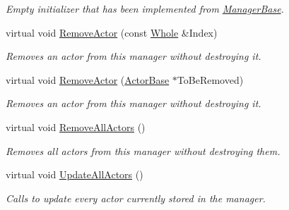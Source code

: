 \begin{DoxyCompactItemize}
\begin{DoxyCompactList}\small\item\em Empty initializer that has been implemented from \hyperlink{classMezzanine_1_1ManagerBase}{ManagerBase}. \item\end{DoxyCompactList}\item 
virtual void \hyperlink{classMezzanine_1_1ActorManager_ac74758ad6d5c03b20105d641f0e37de3}{RemoveActor} (const \hyperlink{namespaceMezzanine_adcbb6ce6d1eb4379d109e51171e2e493}{Whole} \&Index)
\begin{DoxyCompactList}\small\item\em Removes an actor from this manager without destroying it. \item\end{DoxyCompactList}\item 
virtual void \hyperlink{classMezzanine_1_1ActorManager_a5c28bea0eb64822ce94ce38762aedc1e}{RemoveActor} (\hyperlink{classMezzanine_1_1ActorBase}{ActorBase} $\ast$ToBeRemoved)
\begin{DoxyCompactList}\small\item\em Removes an actor from this manager without destroying it. \item\end{DoxyCompactList}\item 
\hypertarget{classMezzanine_1_1ActorManager_a6ca8342617fa221b0548ff9bc6bf4477}{
virtual void \hyperlink{classMezzanine_1_1ActorManager_a6ca8342617fa221b0548ff9bc6bf4477}{RemoveAllActors} ()}
\label{classMezzanine_1_1ActorManager_a6ca8342617fa221b0548ff9bc6bf4477}

\begin{DoxyCompactList}\small\item\em Removes all actors from this manager without destroying them. \item\end{DoxyCompactList}\item 
\hypertarget{classMezzanine_1_1ActorManager_a09ae1e126a501cd932dbbc9290120b7d}{
virtual void \hyperlink{classMezzanine_1_1ActorManager_a09ae1e126a501cd932dbbc9290120b7d}{UpdateAllActors} ()}
\label{classMezzanine_1_1ActorManager_a09ae1e126a501cd932dbbc9290120b7d}

\begin{DoxyCompactList}\small\item\em Calls to update every actor currently stored in the manager. \item\end{DoxyCompactList}\end{DoxyCompactItemize}
